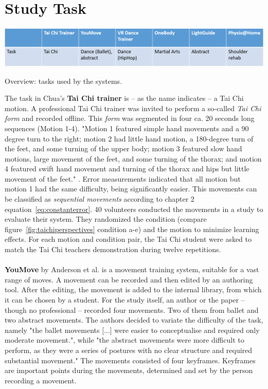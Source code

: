 \section{Study Task}
\begin{table}[h]
	\centering
	\includegraphics[width=1.0\textwidth]{img/tbl2.png}
	\caption{Overview: tasks used by the systems.}
	\label{fig:tbl1}
\end{table}
The task in Chua's \cite{Chua2003} \textbf{Tai Chi trainer} is \--- as the name indicates \--- a Tai Chi motion. A professional Tai Chi trainer was invited to perform a so-called \textit{Tai Chi form} and recorded offline. This \textit{form} was segmented in four ca. 20 seconds long sequences (Motion 1-4). "Motion 1 featured simple hand movements and a 90 degree turn to the right; motion 2 had little hand motion, a 180-degree turn of the feet, and some turning of the upper body; motion 3 featured slow hand motions, large movement of the feet, and some turning of the thorax; and motion 4 featured swift hand movement and turning of the thorax and hips but little movement of the feet." \cite{Chua2003}. Error measurements indicated that all motion but motion 1 had the same difficulty, being significantly easier. This movements can be classified as \textit{sequential movements} according to chapter 2 equation~\ref{eq:constanterror}. 40 volunteers conducted the movements in a study to evaluate their system. They randomized the condition (compare figure~\ref{fig:taichiperspectives} condition a-e) and the motion to minimize learning effects. For each motion and condition pair, the Tai Chi student were asked to match the Tai Chi teachers demonstration during twelve repetitions.\\ \\
\textbf{YouMove} by Anderson et al. \cite{Anderson2013a} is a movement training system, suitable for a vast range of moves. A movement can be recorded and then edited by an authoring tool. After the editing, the movement is added to the internal library, from which it can be chosen by a student. For the study itself, an author or the paper \--- though no professional \--- recorded four movements. Two of them from ballet and two abstract movements. The authors decided to variate the difficulty of the task, namely "the ballet movements [...] were easier to conceptualise and required only moderate movement.", while "the abstract movements were more difficult to perform, as they were a series of postures with no clear structure and required substantial movement." The movements consisted of four keyframes. Keyframes are important points during the movements, determined and set by the person recording a movement.\\ \\
